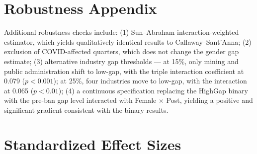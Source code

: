 \documentclass[12pt]{article}
\begin{document}
\section{Robustness Appendix}

Additional robustness checks include: (1) Sun--Abraham interaction-weighted estimator, which yields qualitatively identical results to Callaway--Sant'Anna; (2) exclusion of COVID-affected quarters, which does not change the gender gap estimate; (3) alternative industry gap thresholds --- at 15\%, only mining and public administration shift to low-gap, with the triple interaction coefficient at 0.079 ($p < 0.001$); at 25\%, four industries move to low-gap, with the interaction at 0.065 ($p < 0.01$); (4) a continuous specification replacing the HighGap binary with the pre-ban gap level interacted with Female $\times$ Post, yielding a positive and significant gradient consistent with the binary results.

\section{Standardized Effect Sizes}
\label{sec:sde}


\end{document}
